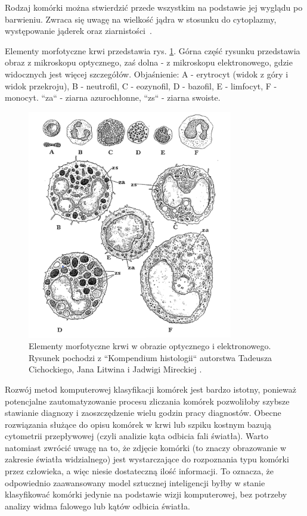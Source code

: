 Rodzaj komórki można stwierdzić przede wszystkim na podstawie jej wyglądu po barwieniu.
Zwraca się uwagę na wielkość jądra w stosunku do cytoplazmy, występowanie jąderek oraz ziarnistości~\cite{histology}.

Elementy morfotyczne krwi przedstawia rys. \ref{fig:electron_microscope}.
Górna część rysunku przedstawia obraz z mikroskopu optycznego, zaś dolna - z mikroskopu elektronowego, gdzie widocznych jest więcej szczegółów.
Objaśnienie: A - erytrocyt (widok z góry i widok przekroju), B - neutrofil, C - eozynofil, D - bazofil, E - limfocyt, F - monocyt. “za“ - ziarna azurochłonne, “zs“
- ziarna swoiste.

\begin{figure}
    \centering
    \includegraphics[width=0.8\textwidth]{morfotyczne}
    \caption{Elementy morfotyczne krwi w obrazie optycznego i elektronowego. Rysunek pochodzi z “Kompendium histologii“ autorstwa Tadeusza Cichockiego, Jana Litwina i Jadwigi Mireckiej \cite{histology}.}
    \label{fig:electron_microscope}
\end{figure}

Rozwój metod komputerowej klasyfikacji komórek jest bardzo istotny, ponieważ potencjalne zautomatyzowanie procesu zliczania komórek pozwoliłoby szybsze stawianie diagnozy i zaoszczędzenie wielu godzin pracy diagnostów.
Obecne rozwiązania służące do opisu komórek w krwi lub szpiku kostnym bazują cytometrii przepływowej (czyli analizie kąta odbicia fali światła).
Warto natomiast zwrócić uwagę na to, że zdjęcie komórki (to znaczy obrazowanie w zakresie światła widzialnego) jest wystarczające do rozpoznania typu komórki przez człowieka, a więc niesie dostateczną ilość informacji.
To oznacza, że odpowiednio zaawansowany model sztucznej inteligencji byłby w stanie klasyfikować komórki jedynie na podstawie wizji komputerowej, bez potrzeby analizy widma falowego lub kątów odbicia światła.


